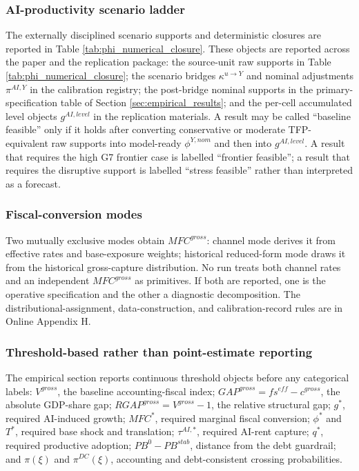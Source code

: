 \documentclass[11pt,a4paper]{article}
\begin{document}
\subsubsection{AI-productivity scenario ladder}

The externally disciplined scenario supports and deterministic closures are reported in Table \ref{tab:phi_numerical_closure}. These objects are reported across the paper and the replication package: the source-unit raw supports in Table \ref{tab:phi_numerical_closure}; the scenario bridges $\kappa^{u\to Y}$ and nominal adjustments $\pi^{AI,Y}$ in the calibration registry; the post-bridge nominal supports in the primary-specification table of Section \ref{sec:empirical_results}; and the per-cell accumulated level objects $g^{AI,level}$ in the replication materials.
A result may be called ``baseline feasible'' only if it holds after converting conservative or moderate TFP-equivalent raw supports into model-ready $\phi^{Y,nom}$ and then into $g^{AI,level}$. A result that requires the high G7 frontier case is labelled ``frontier feasible''; a result that requires the disruptive support is labelled ``stress feasible'' rather than interpreted as a forecast.

\subsubsection{Fiscal-conversion modes}

Two mutually exclusive modes obtain $MFC^{gross}$: channel mode derives it from effective rates and base-exposure weights; historical reduced-form mode draws it from the historical gross-capture distribution. No run treats both channel rates and an independent $MFC^{gross}$ as primitives. If both are reported, one is the operative specification and the other a diagnostic decomposition. The distributional-assignment, data-construction, and calibration-record rules are in Online Appendix H.

\subsubsection{Threshold-based rather than point-estimate reporting}

The empirical section reports continuous threshold objects before any categorical labels:
$V^{gross}$, the baseline accounting-fiscal index; $GAP^{gross}=fs^{eff}-c^{gross}$, the absolute GDP-share gap; $RGAP^{gross}=V^{gross}-1$, the relative structural gap; $g^*$, required AI-induced growth; $MFC^*$, required marginal fiscal conversion; $\phi^*$ and $T^*$, required base shock and translation; $\tau^{AI,*}$, required AI-rent capture; $q^*$, required productive adoption; $PB^0-PB^{stab}$, distance from the debt guardrail; and $\pi(\xi)$ and $\pi^{DC}(\xi)$, accounting and debt-consistent crossing probabilities.
\end{document}
